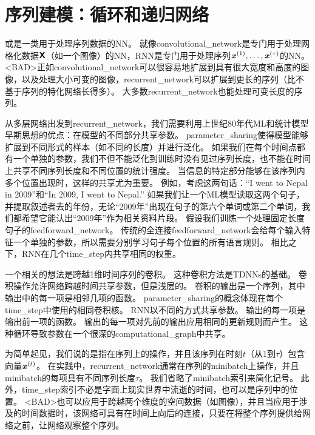 \chapter{序列建模：循环和递归网络}
\label{chap:sequence_modeling_recurrent_and_recursive_nets}
或\citep{RHW}是一类用于处理序列数据的\gls{NN}。
就像\gls{convolutional_network}是专门用于处理网格化数据$\textsf{\textbf{X}}$（如一个图像）的\gls{NN}，\gls{RNN}是专门用于处理序列$\boldsymbol{\mathit{x}}^{(1)}, \dots, \boldsymbol{\mathit{x}}^{(\tau)}$的\gls{NN}。
<BAD>正如\gls{convolutional_network}可以很容易地扩展到具有很大宽度和高度的图像，以及处理大小可变的图像，\gls{recurrent_network}可以扩展到更长的序列（比不基于序列的特化网络长得多）。
大多数\gls{recurrent_network}也能处理可变长度的序列。 

从多层网络出发到\gls{recurrent_network}，我们需要利用上世纪80年代\gls{ML}和统计模型早期思想的优点：在模型的不同部分共享参数。
\gls{parameter_sharing}使得模型能够扩展到不同形式的样本（如不同的长度）并进行泛化。
如果我们在每个时间点都有一个单独的参数，我们不但不能泛化到训练时没有见过序列长度，也不能在时间上共享不同序列长度和不同位置的统计强度。
当信息的特定部分能够在该序列内多个位置出现时，这样的共享尤为重要。
例如，考虑这两句话：``I went to Nepal in 2009''和``In 2009, I went to Nepal.'' 
如果我们让一个\gls{ML}模型读取这两个句子，并提取叙述者去的年份，无论``2009年''出现在句子的第六个单词或第二个单词，我们都希望它能认出``2009年''作为相关资料片段。
假设我们训练一个处理固定长度句子的\gls{feedforward_network}。
传统的全连接\gls{feedforward_network}会给每个输入特征一个单独的参数，所以需要分别学习句子每个位置的所有语言规则。
相比之下，\gls{RNN}在几个\gls{time_step}内共享相同的权重。


一个相关的想法是跨越1维时间序列的卷积。
这种卷积方法是\gls{TDNNs}的基础\citep{Lang+Hinton88,Waibel89b,lang1990time}。
卷积操作允许网络跨越时间共享参数，但是浅层的。
卷积的输出是一个序列，其中输出中的每一项是相邻几项的函数。
\gls{parameter_sharing}的概念体现在每个\gls{time_step}中使用的相同卷积核。
\gls{RNN}以不同的方式共享参数。
输出的每一项是输出前一项的函数。
输出的每一项对先前的输出应用相同的更新规则而产生。
这种循环导致参数在一个很深的\gls{computational_graph}中共享。

为简单起见，我们说的是指在序列上的操作，并且该序列在时刻$t$（从1到$\tau$）包含向量$\boldsymbol{\mathit{x}}^{(t)}$。
在实践中，\gls{recurrent_network}通常在序列的\gls{minibatch}上操作，并且\gls{minibatch}的每项具有不同序列长度$\tau$。
我们省略了\gls{minibatch}索引来简化记号。
此外，\gls{time_step}索引不必是字面上现实世界中流逝的时间，也可以是序列中的位置。
<BAD>也可以应用于跨越两个维度的空间数据（如图像），并且当应用于涉及的时间数据时，该网络可具有在时间上向后的连接，只要在将整个序列提供给网络之前，让网络观察整个序列。

